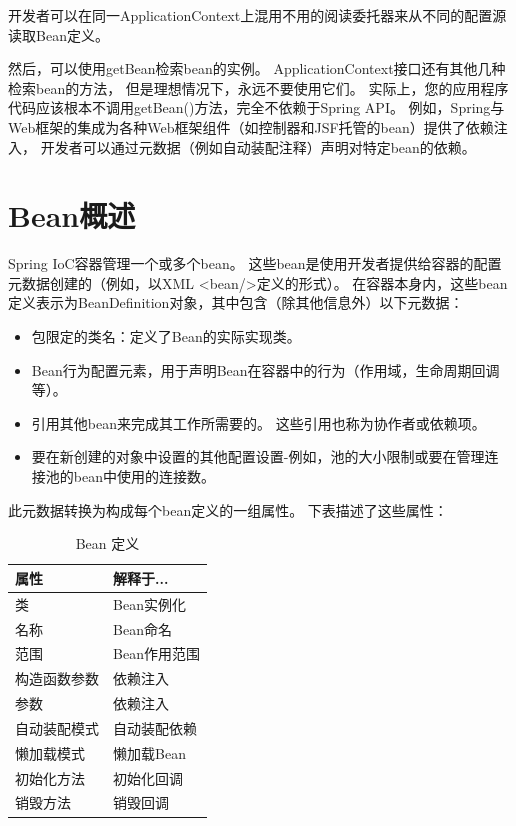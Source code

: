 开发者可以在同一ApplicationContext上混用不用的阅读委托器来从不同的配置源读取Bean定义。

然后，可以使用getBean检索bean的实例。 
ApplicationContext接口还有其他几种检索bean的方法，
但是理想情况下，永远不要使用它们。 
实际上，您的应用程序代码应该根本不调用getBean()方法，完全不依赖于Spring API。 
例如，Spring与Web框架的集成为各种Web框架组件（如控制器和JSF托管的bean）提供了依赖注入，
开发者可以通过元数据（例如自动装配注释）声明对特定bean的依赖。

\section{Bean概述}
Spring IoC容器管理一个或多个bean。 
这些bean是使用开发者提供给容器的配置元数据创建的（例如，以XML <bean/>定义的形式）。 
在容器本身内，这些bean定义表示为BeanDefinition对象，其中包含（除其他信息外）以下元数据：

\begin{itemize}
    \item 包限定的类名：定义了Bean的实际实现类。
    \item Bean行为配置元素，用于声明Bean在容器中的行为（作用域，生命周期回调等）。
    \item 引用其他bean来完成其工作所需要的。 这些引用也称为协作者或依赖项。
    \item 要在新创建的对象中设置的其他配置设置-例如，池的大小限制或要在管理连接池的bean中使用的连接数。
\end{itemize}

此元数据转换为构成每个bean定义的一组属性。 下表描述了这些属性：

\begin{longtable}[ht]{|l|l|}
    \caption{Bean 定义}\\
    \hline
    属性&解释于...\\
    \hline
    类&Bean实例化\\
    \hline
    名称&Bean命名\\
    \hline
    范围&Bean作用范围\\
    \hline
    构造函数参数&依赖注入\\
    \hline
    参数&依赖注入\\
    \hline
    自动装配模式&自动装配依赖\\
    \hline
    懒加载模式&懒加载Bean\\
    \hline
    初始化方法&初始化回调\\
    \hline
    销毁方法&销毁回调\\
    \hline
\end{longtable}

